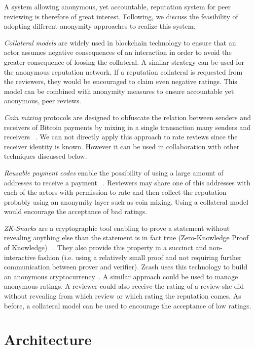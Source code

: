 A system allowing anonymous, yet accountable, reputation system for peer
reviewing is therefore of great interest. Following, we discuss the feasibility
of adopting different anonymity approaches to realize this system.

\emph{Collateral models} are widely used in blockchain technology to ensure that
an actor assumes negative consequences of an interaction in order to avoid the
greater consequence of loosing the collateral. A similar strategy can be used
for the anonymous reputation network. If a reputation collateral is requested
from the reviewers, they would be encouraged to claim even negative ratings.
This model can be combined with anonymity measures to ensure accountable yet
anonymous, peer reviews.

\emph{Coin mixing} protocols are designed to obfuscate the relation between
senders and receivers of Bitcoin payments by mixing in a single transaction many
senders and receivers ~\cite{meiklejohn2015privacy}. We can not directly apply
this approach to rate reviews since the receiver identity is known. However it
can be used in collaboration with other techniques discussed below.

\emph{Reusable payment codes} enable the possibility of using a large amount of
addresses to receive a payment ~\cite{harrigan2016unreasonable,
  ranvierReusable}. Reviewers may share one of this addresses with each of the
actors with permission to rate and then collect the reputation probably using an
anonymity layer such as coin mixing. Using a collateral model would encourage
the acceptance of bad ratings.

\emph{ZK-Snarks} are a cryptographic tool enabling to prove a statement without
revealing anything else than the statement is in fact true (Zero-Knowledge Proof
of Knowledge) ~\cite{blum1988non,bitansky2013succinct}. They also provide this
property in a succinct and non-interactive fashion (i.e. using a relatively
small proof and not requiring further communication between prover and
verifier). Zcash uses this technology to build an anonymous
cryptocurrency~\cite{sasson2014zerocash}. A similar approach could be used to
manage anonymous ratings. A reviewer could also receive the rating of a review
she did without revealing from which review or which rating the reputation
comes. As before, a collateral model can be used to encourage the acceptance of
low ratings.

\section{Architecture}

